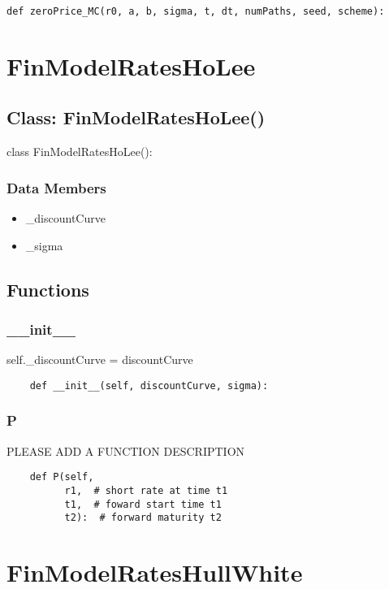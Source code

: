 \documentclass[twoside,11pt]{book}
\begin{document}
\begin{lstlisting}
def zeroPrice_MC(r0, a, b, sigma, t, dt, numPaths, seed, scheme):
\end{lstlisting}

\newpage
\section{FinModelRatesHoLee}

\subsection*{Class: FinModelRatesHoLee()}
class FinModelRatesHoLee(): 

\subsubsection*{Data Members}
\begin{itemize}
\item{\_discountCurve}
\item{\_sigma}
\end{itemize}

\subsection*{Functions}

\subsubsection*{{\bf \_\_init\_\_}}
self.\_discountCurve = discountCurve 

\begin{lstlisting}
    def __init__(self, discountCurve, sigma):
\end{lstlisting}

\subsubsection*{{\bf P}}
PLEASE ADD A FUNCTION DESCRIPTION

\begin{lstlisting}
    def P(self,
          r1,  # short rate at time t1
          t1,  # foward start time t1
          t2):  # forward maturity t2
\end{lstlisting}

\newpage
\section{FinModelRatesHullWhite}
\end{document}
